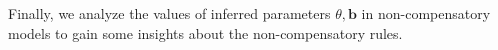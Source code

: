 \documentclass[letterpaper]{article} %
\newcommand{\Rating}{\mathbf{X}}
\begin{document}
Finally, we analyze the values of inferred parameters $\theta,\mathbf{b}$ in non-compensatory models to gain some insights about the non-compensatory rules. 
%
\end{document}
